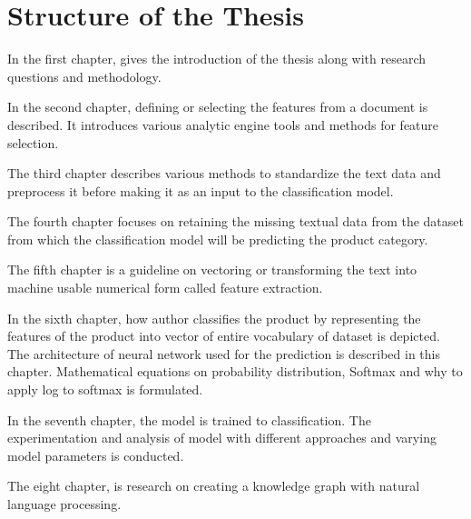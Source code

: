 \section{Structure of the Thesis}

In the first chapter, gives the introduction of the thesis along with research questions and methodology.

In the second chapter, defining or selecting the features from a document is described. It introduces various analytic engine tools and methods for feature selection. 

The third chapter describes various methods to standardize the text data and preprocess it before making it as an input to the classification model.

The fourth chapter focuses on retaining the missing textual data from the dataset from which the classification model will be predicting the product category. 

The fifth chapter is a guideline on vectoring or transforming the text into machine usable numerical form called feature extraction.

In the sixth chapter, how author classifies the product by representing the features of the product into vector of entire vocabulary of dataset is depicted. The architecture of neural network used for the prediction is described in this chapter. Mathematical equations on probability distribution, Softmax and why to apply log to softmax is formulated. 

In the seventh chapter, the model is trained to classification. The experimentation and analysis of model with different approaches and varying model parameters is conducted.

The eight chapter, is research on creating a knowledge graph with natural language processing.